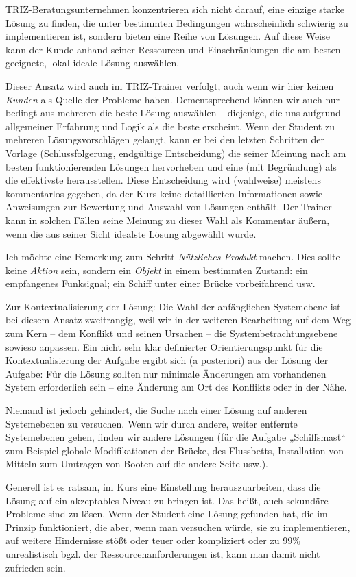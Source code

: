 \documentclass[11pt,a4paper]{article}
\begin{document}
TRIZ-Beratungsunternehmen konzentrieren sich nicht darauf, eine einzige starke
Lösung zu finden, die unter bestimmten Bedingungen wahrscheinlich schwierig zu
implementieren ist, sondern bieten eine Reihe von Lösungen. Auf diese Weise
kann der Kunde anhand seiner Ressourcen und Einschränkungen die am besten
geeignete, lokal ideale Lösung auswählen.
 
Dieser Ansatz wird auch im TRIZ-Trainer verfolgt, auch wenn wir hier keinen
\emph{Kunden} als Quelle der Probleme haben. Dementsprechend können wir auch
nur bedingt aus mehreren die beste Lösung auswählen -- diejenige, die uns
aufgrund allgemeiner Erfahrung und Logik als die beste erscheint. Wenn der
Student zu mehreren Lösungsvorschlägen gelangt, kann er bei den letzten
Schritten der Vorlage (Schlussfolgerung, endgültige Entscheidung) die seiner
Meinung nach am besten funktionierenden Lösungen hervorheben und eine (mit
Begründung) als die effektivste herausstellen. Diese Entscheidung wird
(wahlweise) meistens kommentarlos gegeben, da der Kurs keine detaillierten
Informationen sowie Anweisungen zur Bewertung und Auswahl von Lösungen
enthält. Der Trainer kann in solchen Fällen seine Meinung zu dieser Wahl als
Kommentar äußern, wenn die aus seiner Sicht idealste Lösung abgewählt wurde.

Ich möchte eine Bemerkung zum Schritt \emph{Nützliches Produkt} machen. Dies
sollte keine \emph{Aktion} sein, sondern ein \emph{Objekt} in einem bestimmten
Zustand: ein empfangenes Funksignal; ein Schiff unter einer Brücke
vorbeifahrend usw.
 
Zur Kontextualisierung der Lösung: Die Wahl der anfänglichen Systemebene ist
bei diesem Ansatz zweitrangig, weil wir in der weiteren Bearbeitung auf dem
Weg zum Kern -- dem Konflikt und seinen Ursachen -- die
Systembetrachtungsebene sowieso anpassen. Ein nicht sehr klar definierter
Orientierungspunkt für die Kontextualisierung der Aufgabe ergibt sich (a
posteriori) aus der Lösung der Aufgabe: Für die Lösung sollten nur minimale
Änderungen am vorhandenen System erforderlich sein -- eine Änderung am Ort des
Konflikts oder in der Nähe.

Niemand ist jedoch gehindert, die Suche nach einer Lösung auf anderen
Systemebenen zu versuchen. Wenn wir durch andere, weiter entfernte
Systemebenen gehen, finden wir andere Lösungen (für die Aufgabe „Schiffsmast“
zum Beispiel globale Modifikationen der Brücke, des Flussbetts, Installation
von Mitteln zum Umtragen von Booten auf die andere Seite usw.).

Generell ist es ratsam, im Kurs eine Einstellung herauszuarbeiten, dass die
Lösung auf ein akzeptables Niveau zu bringen ist. Das heißt, auch sekundäre
Probleme sind zu lösen.  Wenn der Student eine Lösung gefunden hat, die im
Prinzip funktioniert, die aber, wenn man versuchen würde, sie zu
implementieren, auf weitere Hindernisse stößt oder teuer oder kompliziert oder
zu 99\% unrealistisch bgzl. der Ressourcenanforderungen ist, kann man damit
nicht zufrieden sein.
\end{document}
